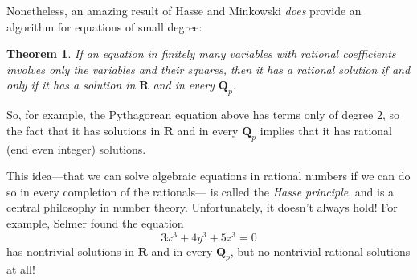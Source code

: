 \documentclass[11pt]{amsart}
\newcommand*{\R}{\ensuremath{\mathbf{R}}}
\newcommand*{\Q}{\ensuremath{\mathbf{Q}}}
\theoremstyle{plain}
\newtheorem{theorem}{Theorem}
\theoremstyle{definition}
\theoremstyle{remark}
\numberwithin{theorem}{section}
\numberwithin{equation}{section}
\begin{document}
Nonetheless, an amazing result of Hasse and Minkowski {\em does} provide an algorithm for equations of small degree:

\begin{theorem}
	If an equation in finitely many variables with rational coefficients involves only the variables and their squares, 
	then it has a rational solution if and only if it has a solution in $\R$ and in every $\Q_p$.
\end{theorem}

So, for example, the Pythagorean equation above has terms only of degree $2$, so the fact that it has solutions in $\R$
and in every $\Q_p$ implies that it has rational (end even integer) solutions.

This idea---that we can solve algebraic equations in rational numbers if we can do so in every completion of the rationals---
is called the {\em Hasse principle}, and is a central philosophy in number theory.  Unfortunately, it doesn't always hold!
For example, Selmer found the equation
$$
	3x^3 + 4y^3 + 5z^3 = 0
$$
has nontrivial solutions in $\R$ and in every $\Q_p$, but no nontrivial rational solutions at all!




 
\end{document}
